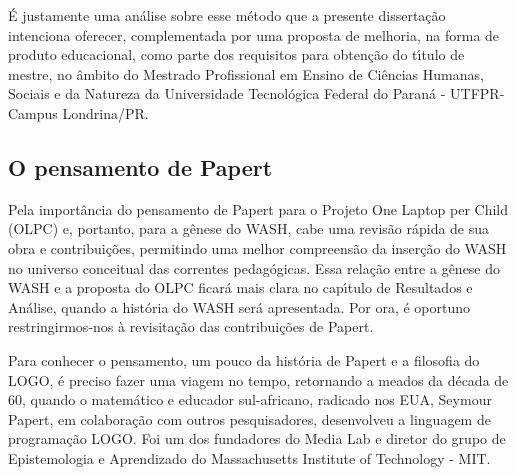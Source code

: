 \documentclass[
12pt,		%
openright,	%
twoside,  %
a4paper,			%
chapter=TITLE,		%
english,			%
french,				%
spanish,			%
brazil				%
]{USPSC-classe/USPSC}
\begin{document}
\'E justamente uma an\'alise sobre esse m\'etodo que a presente disserta\c{c}\~ao intenciona oferecer, complementada por uma proposta de melhoria, na forma de produto educacional, como parte dos requisitos para obten\c{c}\~ao do t\'{\i}tulo de mestre, no \^ambito do Mestrado Profissional em Ensino de Ci\^encias Humanas, Sociais e da Natureza da Universidade  Tecnol\'ogica Federal do Paran\'a - UTFPR- Campus Londrina/PR.

















\subsection[O pensamento de Papert]{O pensamento de Papert}\label{O pensamento de Papert}
Pela import\^ancia do pensamento de Papert para o Projeto One Laptop per Child (OLPC) e, portanto, para a g\^enese do WASH, cabe uma revis\~ao r\'apida de sua obra e contribui\c{c}\~oes, permitindo uma melhor compreens\~ao da inser\c{c}\~ao do WASH no universo conceitual das correntes pedag\'ogicas. Essa rela\c{c}\~ao entre a g\^enese do WASH e a proposta do OLPC ficar\'a mais clara no cap\'{\i}tulo de Resultados e An\'alise, quando a hist\'oria do WASH ser\'a apresentada. Por ora, \'e oportuno restringirmos-nos \`a revisita\c{c}\~ao das contribui\c{c}\~oes de Papert.

















Para conhecer  o pensamento, um pouco da hist\'oria de Papert e  a filosofia do LOGO, \'e preciso fazer uma viagem no tempo, retornando a meados da d\'ecada de 60, quando o matem\'atico e educador sul-africano, radicado nos EUA, Seymour Papert, em colabora\c{c}\~ao com outros pesquisadores, desenvolveu a linguagem  de programa\c{c}\~ao LOGO.  Foi um dos fundadores do Media Lab e diretor do grupo de Epistemologia e Aprendizado do Massachusetts Institute of Technology - MIT.
\end{document}
